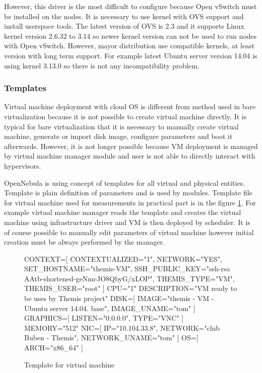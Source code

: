 However, this driver is the most difficult to configure because Open vSwitch must be installed on the nodes. It is necessary to use kernel with \Ac{OVS} support and install userspace tools. The latest version of \Ac{OVS} is 2.3 and it supports Linux kernel version 2.6.32 to 3.14 so newer kernel version can not be used to run nodes with Open vSwitch. However, mayor distribution use compatible kernels, at least version with long term support. For example latest Ubuntu server version 14.04 is using kernel 3.13.0 so there is not any incompatibility problem.

\subsubsection{Templates}
Virtual machine deployment with cloud \Ac{OS} is different from method used in bare virtualization because it is not possible to create virtual machine directly. It is typical for bare virtualization that it is necessary to manually create virtual machine, generate or import disk image, configure parameters and boot it afterwards. However, it is not longer possible because \Ac{VM} deployment is managed by virtual machine manager module and user is not able to directly interact with hypervisors. 

OpenNebula is using concept of templates for all virtual and physical entities. Template is plain definition of parameters and is used by modules. Template file for virtual machine used for measurements in practical part is in the figure \ref{code:template}. For example virtual machine manager reads the template and creates the virtual machine using infrastructure driver and \Ac{VM} is then deployed by scheduler. It is of course possible to manually edit parameters of virtual machine however initial creation must be always performed by the manager.

\begin{figure}[htb]
\caption{Template for virtual machine}
\label{code:template}
\begin{verbatimtab}
CONTEXT=[
	CONTEXTUALIZED="1",
	NETWORK="YES",
	SET_HOSTNAME="themis-VM",
	SSH_PUBLIC_KEY="ssh-rsa AAtb-shortened-geNmcJO8QbyG/xLOP",
	THEMIS_TYPE="VM",
	THEMIS_USER="root"
	]
CPU="1"
DESCRIPTION="VM ready to be uses by Themis project"
DISK=[
	IMAGE="themis - VM - Ubuntu server 14.04. base",
	IMAGE_UNAME="tom"
	]
GRAPHICS=[
	LISTEN="0.0.0.0",
	TYPE="VNC"
	]
MEMORY="512"
NIC=[
	IP="10.104.33.8",
	NETWORK="club Buben - Themis",
	NETWORK_UNAME="tom"
	]
OS=[
	ARCH="x86_64"
	]
\end{verbatimtab}
\end{figure}

